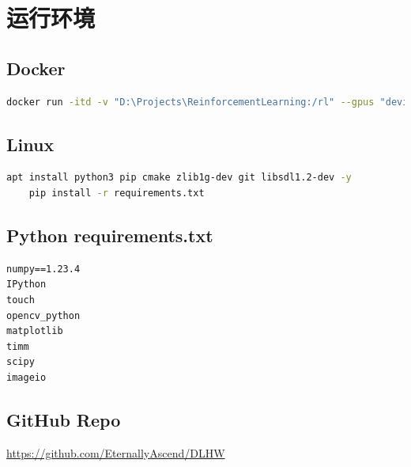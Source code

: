 \documentclass[final,1p,12pt,UTF8,review]{elsarticle}
\begin{document}
\section{运行环境}
\subsection{Docker}
\begin{lstlisting}[language=sh]
    docker run -itd -v "D:\Projects\ReinforcementLearning:/rl" --gpus "device=0" --name "Ubuntu" ubuntu /bin/bash
\end{lstlisting}
\subsection{Linux}
\begin{lstlisting}[language=sh]
    apt install python3 pip cmake zlib1g-dev git libsdl1.2-dev -y
    pip install -r requirements.txt
\end{lstlisting}
\subsection{Python requirements.txt}
\begin{lstlisting}
numpy==1.23.4
IPython
touch
opencv_python
matplotlib
timm
scipy
imageio
\end{lstlisting}
\subsection{GitHub Repo}
\url{https://github.com/EternallyAscend/DLHW}
\end{document}
